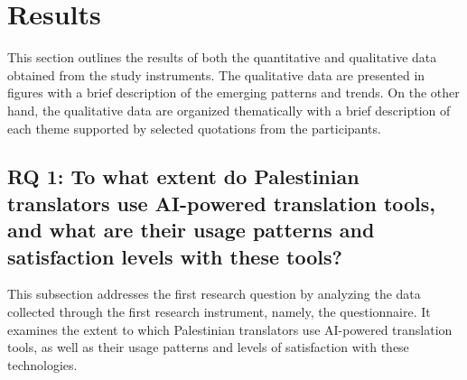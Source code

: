 \documentclass[english]{textolivre}
\begin{document}
\section{Results}\label{sec-secoes}
This section outlines the results of both the quantitative and qualitative data obtained from the study instruments. The qualitative data are presented in figures with a brief description of the emerging patterns and trends. On the other hand, the qualitative data are organized thematically with a brief description of each theme supported by selected quotations from the participants.

\subsection{RQ 1: To what extent do Palestinian translators use AI-powered translation tools, and what are their usage patterns and satisfaction levels with these tools?}\label{sec-format-simple}
This subsection addresses the first research question by analyzing the data collected through the first research instrument, namely, the questionnaire. It examines the extent to which Palestinian translators use AI-powered translation tools, as well as their usage patterns and levels of satisfaction with these technologies.
\end{document}
